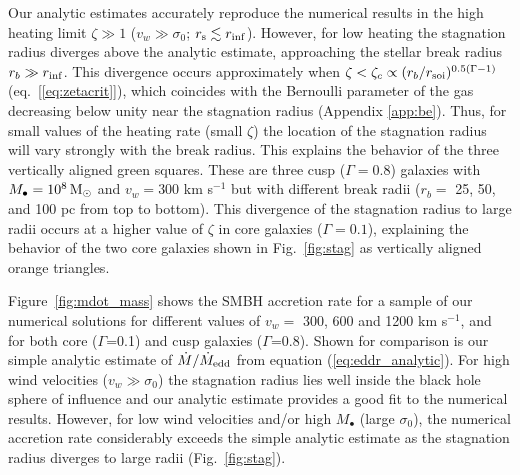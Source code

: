 \documentclass[usenatbib,fleqn]{mn2e}
\newcommand{\rb}{r_b}
\newcommand{\Mbh}[1][]{M_{\bullet#1}}
\newcommand{\vwO}{v_{w}}
\begin{document}
Our analytic estimates accurately reproduce the numerical results in
the high heating limit $\zeta \gg 1$ ($v_w \gg \sigma_0$; $r_{\rm s}
\lesssim r_{\rm inf}$).  However, for low heating the stagnation
radius diverges above the analytic estimate, approaching the stellar
break radius $r_b \gg r_{\rm inf}$.  This divergence occurs
approximately when $\zeta < \zeta_c \propto (r_b/r_{\rm
  soi})^{0.5(\Gamma-1)}$ (eq.~[\ref{eq:zetacrit}]), which coincides
with the Bernoulli parameter of the gas decreasing below unity near
the stagnation radius (Appendix \ref{app:be}).  Thus, for small values
of the heating rate (small $\zeta$) the location of the stagnation
radius will vary strongly with the break radius. This explains the
behavior of the three vertically aligned green squares. These are
three cusp ($\Gamma=0.8$) galaxies with $\Mbh=10^8 \Msun$ and
$v_w=300$ km s$^{-1}$ but with different break radii ($\rb=$ 25, 50,
and 100 pc from top to bottom). This divergence of the stagnation
radius to large radii occurs at a higher value of $\zeta$ in core
galaxies ($\Gamma = 0.1$), explaining the behavior of the two core
galaxies shown in Fig.~\ref{fig:stag} as vertically aligned orange
triangles.


Figure~\ref{fig:mdot_mass} shows the SMBH accretion rate for a sample of
our numerical solutions for different values of
$\vwO =$ 300, 600 and 1200 km s$^{-1}$, and for both core
($\Gamma$=0.1) and cusp galaxies ($\Gamma$=0.8).  Shown for comparison
is our simple analytic estimate of $\dot{M}/\dot{M}_{\rm edd}$ from equation
(\ref{eq:eddr_analytic}).  For high wind velocities ($v_{w} \gg
\sigma_0$) the stagnation radius lies well inside the black hole sphere of
influence and our analytic estimate provides a good fit to the
numerical results.  However, for low wind velocities and/or high
$M_{\bullet}$ (large $\sigma_0$), the numerical accretion rate
considerably exceeds the simple analytic estimate as the stagnation radius
diverges to large radii (Fig.~\ref{fig:stag}).
\end{document}
